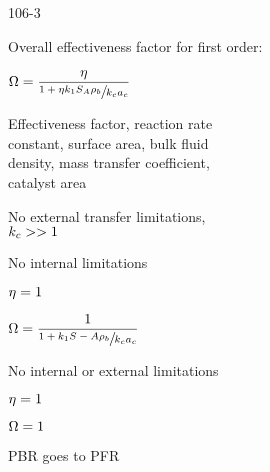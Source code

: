 \begin{mitframe}{106-3}
\begin{listone}
\item Overall effectiveness factor for first order:
\item $\mpc=\dfrac{\intrinsvisc}{\sfrac{1+\intrinsvisc\thermcond_1\entropy_{\helmholtz}\dens_b}{\thermcond_c\activity_c}}$
	\begin{listtwo}
\item Effectiveness factor, reaction rate\\ 
constant, surface area, bulk fluid\\ density, mass transfer coefficient,\\ catalyst area
\item No external transfer limitations, \\
$\thermcond_c>>1$
\item No internal limitations
	\begin{listthree}
    	\item $\intrinsvisc=1$
        \item $\mpc=\dfrac{1}{\sfrac{1+\thermcond_1\entropy-{\helmholtz}\dens_b}{\thermcond_c\activity_c}}$
    \end{listthree}
		\item No internal or external limitations
        	\begin{listthree}
            	\item $\intrinsvisc=1$
                \item $\mpc=1$
                \item PBR goes to PFR
            \end{listthree}
    \end{listtwo}
\end{listone}    
\end{mitframe}